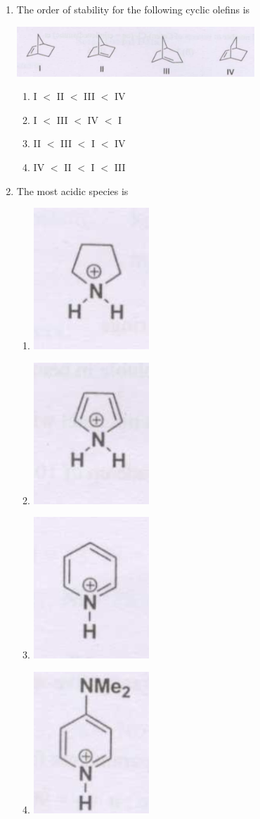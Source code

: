 \documentclass[12pt]{article}
\begin{document}
\begin{enumerate}
\bigskip
    \hfill{}


\item The order of stability for the following cyclic olefins is

\begin{center}
  \includegraphics[width=0.7\columnwidth]{figs/q8.png} 
\end{center}

\begin{enumerate}
  \item I \(<\) II \(<\) III \(<\) IV
  \item I \(<\) III \(<\) IV \(<\) I
  \item II \(<\) III \(<\) I \(<\) IV
  \item IV \(<\) II \(<\) I \(<\) III
\end{enumerate}    \hfill{}


\item The most acidic species is

\begin{enumerate}
    \item \includegraphics[width=0.1\columnwidth]{figs/q9 a.png} 
    \item \includegraphics[width=0.1\columnwidth]{figs/q9 b.png} 
    \item \includegraphics[width=0.1\columnwidth]{figs/q9 c.png} 
    \item \includegraphics[width=0.1\columnwidth]{figs/q9 d.png} 
\end{enumerate}
   \hfill{}





\end{enumerate}
\end{document}

